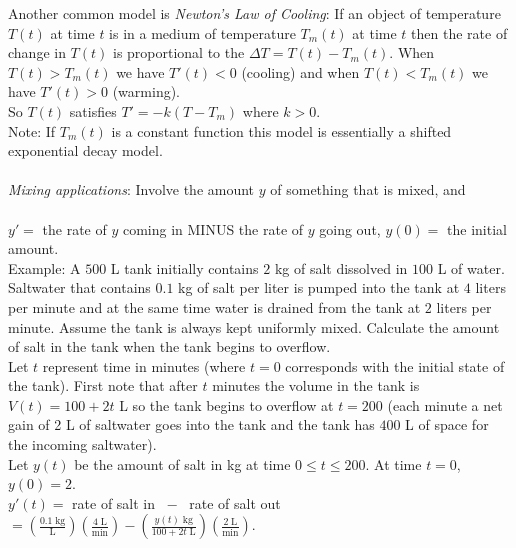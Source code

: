 \documentclass{ximera}
\begin{document}
 \newpage

 Another common model is \emph{Newton's Law of Cooling}:  If an object of temperature $T(t)$ at time $t$ is in a medium of temperature $T_{m}(t)$ at time $t$  then the rate of change in $T(t)$ is proportional to the $\Delta T = T(t)-T_{m}(t)$.  When $T(t)>T_{m}(t)$ we have $T'(t)<0$ (cooling)  and when $T(t)<T_{m}(t)$ we have $T'(t)>0$ (warming).\\


 So $T(t)$ satisfies $T'=-k(T-T_{m})$ where $k>0$.\\

 Note: If $T_m (t)$ is a constant function this model is essentially a shifted exponential decay model.\\ \\


\emph{Mixing applications}:  Involve the amount $y$ of something that is mixed,  and \\ \\ $y'=$ the rate of $y$ coming in MINUS the rate of $y$ going out, $y(0)=$ the initial amount.\\


 Example:   A $500$ L tank initially contains $2$ kg of salt dissolved in $100$ L of water.  Saltwater that contains $0.1$ kg of salt per liter is pumped into the tank at $4$ liters per minute and at the same time water is drained from the tank at $2$ liters per minute.  Assume the tank is always kept uniformly mixed. Calculate the amount of salt in the tank when the tank begins to overflow.\\

 Let $t$ represent time in minutes (where $t=0$ corresponds with the initial state of the tank). First note that after $t$ minutes the volume in the tank is $V(t)=100+2t$ L  so the tank begins to overflow at $t=200$ (each minute a net gain of 2 L of saltwater goes into the tank and the tank has $400$ L of space for the incoming saltwater). \\

 Let $y(t)$ be the amount of salt in kg at time $0\leq t\leq 200$.  At time $t=0$, $y(0)=2$.\\

 $y'(t)=$ rate of salt in $\;-\;$ rate of salt out  $\displaystyle =\left(\frac{0.1 \;\mathrm{kg}}{\mathrm{L}}\right)\left(\frac{4\; \mathrm{L}}{\mathrm{min} }\right)-\left(\frac{y(t)\; \mathrm{kg}}{100+2t\;\mathrm{L}}\right)\left(\frac{2\;\mathrm{L}}{\mathrm{min}}\right)$.\\
\end{document}
